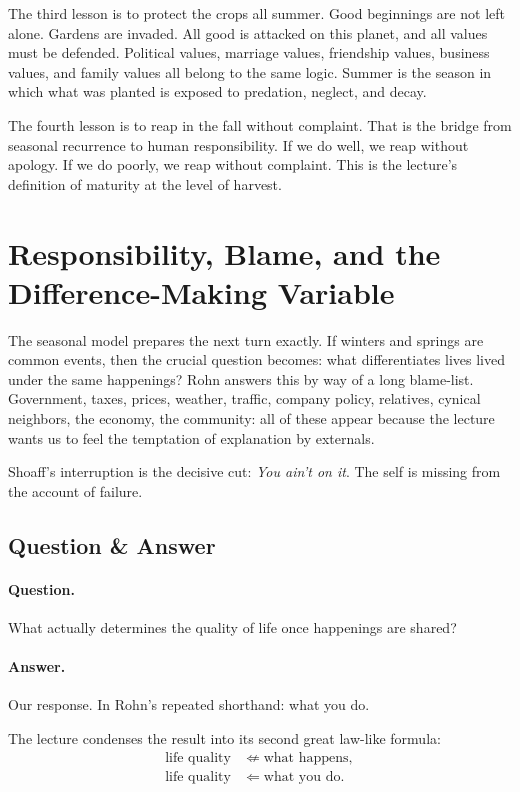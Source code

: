 The third lesson is to protect the crops all summer. Good beginnings are not left alone. Gardens are invaded. All good is attacked on this planet, and all values must be defended. Political values, marriage values, friendship values, business values, and family values all belong to the same logic. Summer is the season in which what was planted is exposed to predation, neglect, and decay.

The fourth lesson is to reap in the fall without complaint. That is the bridge from seasonal recurrence to human responsibility. If we do well, we reap without apology. If we do poorly, we reap without complaint. This is the lecture's definition of maturity at the level of harvest.

\section{Responsibility, Blame, and the Difference-Making Variable}

The seasonal model prepares the next turn exactly. If winters and springs are common events, then the crucial question becomes: what differentiates lives lived under the same happenings? Rohn answers this by way of a long blame-list. Government, taxes, prices, weather, traffic, company policy, relatives, cynical neighbors, the economy, the community: all of these appear because the lecture wants us to feel the temptation of explanation by externals.

Shoaff's interruption is the decisive cut: \emph{You ain't on it}. The self is missing from the account of failure.

\subsection{Question \& Answer}

\paragraph{Question.} What actually determines the quality of life once happenings are shared?

\paragraph{Answer.} Our response. In Rohn's repeated shorthand: what you do.

The lecture condenses the result into its second great law-like formula:
\begin{align}
\text{life quality} &\not\Leftarrow \text{what happens},\\
\text{life quality} &\Leftarrow \text{what you do}.
\end{align}

